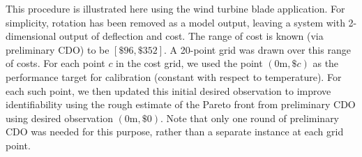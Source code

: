\documentclass{article}
\begin{document}
This procedure is illustrated here using the wind turbine blade application.
%
For simplicity, rotation has been removed as a model output, leaving a system with 2-dimensional output of deflection and cost. 
%
The range of cost is known (via preliminary CDO) to be $[\$96,\$352]$.
%
A 20-point grid was drawn over this range of costs. 
%
%
For each point $c$ in the cost grid, we used the point $(0\mathrm m,\$c)$ as the performance target for calibration (constant with respect to temperature).
%
For each such point, we then updated this initial desired observation to improve identifiability using the rough estimate of the Pareto front from preliminary CDO using desired observation $(0\mathrm m,\$0)$.
%
Note that only one round of preliminary CDO was needed for this purpose, rather than a separate instance at each grid point.
%
%
%
\end{document}
